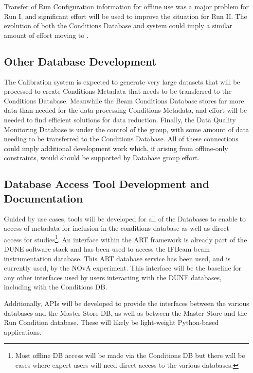 \documentclass[../main-v1.tex]{subfiles}
\begin{document}
Transfer of Run Configuration information for offline use was a major problem for  Run I, and significant effort will be used to improve the situation for Run II.  The evolution of both the  Conditions Database and  system could imply a similar amount of effort moving to .


\subsection{Other Database Development}

The  Calibration system is expected to generate very large datasets that will be processed to create Conditions Metadata that needs to be transferred to the Conditions Database.  Meanwhile the Beam Conditions Database stores far more data than needed for the data processing Conditions Metadata, and effort will be needed to find efficient solutions for data reduction.  Finally, the Data Quality Monitoring Database is under the control of the  group, with some amount of data needing to be transferred to the Conditions Database.  All of these connections could imply additional development work which, if arising from offline-only constraints, would should be supported by Database group effort.


\subsection{Database Access Tool Development and Documentation}

Guided by use cases, tools will be developed for all of the  Databases to enable to access of metadata for inclusion in the conditions database as well as direct access for studies\footnote{Most offline DB access will be made via the Conditions DB but there will be cases where expert users will need direct access to the various databases.}. An interface within the ART framework is already part of the DUNE software stack and has been used to access the IFBeam beam instrumentation database. This ART database service has been used, and is currently used, by the NOvA experiment. This interface will be the baseline for any other interfaces used by users interacting with the DUNE databases, including with the Conditions DB.

Additionally, APIs will be developed to provide the interfaces between the various databases and the Master Store DB, as well as between the Master Store and the Run Condition database. These will likely be light-weight Python-based applications. 
\end{document}
